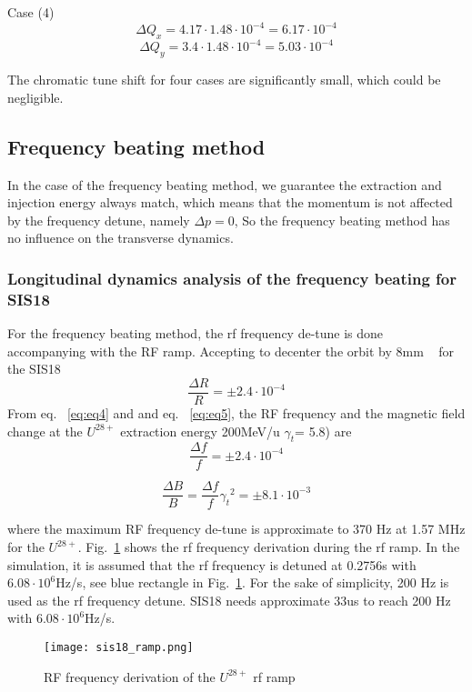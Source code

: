 Case (4) 
\begin{equation}
\Delta Q_x = 4.17 \cdot 1.48 \cdot 10^{-4}=6.17 \cdot 10^{-4}
\end{equation}
\begin{equation}
\Delta Q_y = 3.4 \cdot 1.48 \cdot 10^{-4}=5.03 \cdot 10^{-4} 
\end{equation}

The chromatic tune shift for four cases are significantly small, which could be negligible.
\subsection{Frequency beating method}
In the case of the frequency beating method, we guarantee the extraction and injection energy always match, which means that the momentum is not affected by the frequency detune, namely $\Delta p = 0$, So the frequency beating method has no influence on the transverse dynamics.

\subsubsection{Longitudinal dynamics analysis of the frequency beating for SIS18}
For the frequency beating method, the rf frequency de-tune is done accompanying with
the RF ramp. Accepting to decenter the orbit by 8mm ~\cite{liebermann_fair_2013} for the SIS18 
\begin{equation}
\frac{\Delta{R}}{R} = \pm 2.4 \cdot 10^{-4}
\end{equation}
From eq. ~\ref{eq:eq4} and and eq. ~\ref{eq:eq5}, the RF frequency and the magnetic field change at the $U^{28+}$ extraction energy 200MeV/u  $\gamma_t$= 5.8) are
\begin{equation}
\frac{\Delta{f}}{f} = \pm 2.4 \cdot 10^{-4}
\end{equation}

\begin{equation}
\frac{\Delta{B}}{B}=\frac{\Delta{f}}{f}{\gamma_t}^2 = \pm 8.1 \cdot 10^{-3}
\end{equation}

where the maximum RF frequency de-tune is approximate to 370 Hz at 1.57 MHz for the $U^{ 28+}$. Fig.~\ref{sis18_ramp} shows the rf frequency derivation during the rf ramp. In the simulation, it is assumed that the rf frequency is detuned at 0.2756s with $6.08 \cdot 10^{6}$Hz/s, see blue rectangle in Fig.~\ref{sis18_ramp}. For the sake of simplicity, 200 Hz is used as the rf frequency detune. SIS18 needs approximate 33us to reach 200 Hz with $6.08 \cdot 10^{6}$Hz/s.
\begin{figure}[!htb]
   \centering   
   \texttt{[image: sis18\_ramp.png]}
   \caption{RF frequency derivation of the $U^{28+}$ rf ramp}
   \label{sis18_ramp}
\end{figure}

